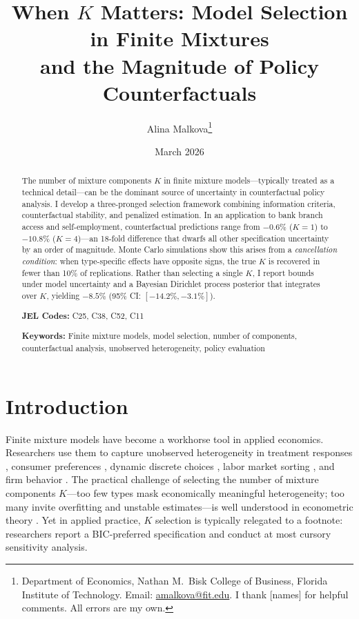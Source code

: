 \documentclass[12pt]{article}
\title{When $K$ Matters: Model Selection in Finite Mixtures\\ and the Magnitude of Policy Counterfactuals}
\author{Alina Malkova\thanks{Department of Economics, Nathan M.\ Bisk College of Business, Florida Institute of Technology. Email: \href{mailto:amalkova@fit.edu}{amalkova@fit.edu}. I thank [names] for helpful comments. All errors are my own.}}
\date{March 2026}
\begin{document}
\maketitle

\begin{abstract}
\noindent The number of mixture components $K$ in finite mixture models---typically treated as a technical detail---can be the dominant source of uncertainty in counterfactual policy analysis. I develop a three-pronged selection framework combining information criteria, counterfactual stability, and penalized estimation. In an application to bank branch access and self-employment, counterfactual predictions range from $-0.6\%$ ($K=1$) to $-10.8\%$ ($K=4$)---an 18-fold difference that dwarfs all other specification uncertainty by an order of magnitude. Monte Carlo simulations show this arises from a \textit{cancellation condition}: when type-specific effects have opposite signs, the true $K$ is recovered in fewer than 10\% of replications. Rather than selecting a single $K$, I report bounds under model uncertainty and a Bayesian Dirichlet process posterior that integrates over $K$, yielding $-8.5\%$ (95\% CI: $[-14.2\%, -3.1\%]$).

\vspace{0.5cm}
\noindent \textbf{JEL Codes:} C25, C38, C52, C11

\vspace{0.3cm}
\noindent \textbf{Keywords:} Finite mixture models, model selection, number of components, counterfactual analysis, unobserved heterogeneity, policy evaluation
\end{abstract}

\newpage

\section{Introduction}

Finite mixture models have become a workhorse tool in applied economics. Researchers use them to capture unobserved heterogeneity in treatment responses \citep{heckman1984}, consumer preferences \citep{keane1997}, dynamic discrete choices \citep{arcidiacono2011}, labor market sorting \citep{bonhomme2019}, and firm behavior \citep{fox2011}. The practical challenge of selecting the number of mixture components $K$---too few types mask economically meaningful heterogeneity; too many invite overfitting and unstable estimates---is well understood in econometric theory \citep{kasahara2009, compiani2016, chen2001}. Yet in applied practice, $K$ selection is typically relegated to a footnote: researchers report a BIC-preferred specification and conduct at most cursory sensitivity analysis.
\end{document}
